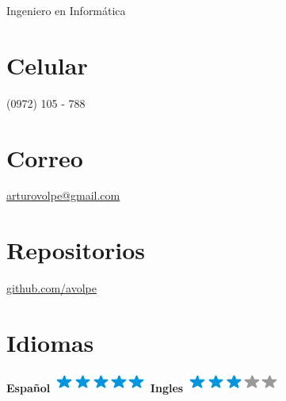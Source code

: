 \documentclass[]{friggeri-cv}
\begin{document}
{Ingeniero en Informática}


\begin{aside}
    \section{Celular}
        (0972) 105 - 788
        ~
    \section{Correo}
        \href{mailto:arturovolpe@gmail.com}{arturovolpe@gmail.com}
        ~
    \section{Repositorios}
        \href{https://github.com/avolpe}{github.com/avolpe}
        ~
\section{Idiomas}
\textbf{Español}\includegraphics[scale=0.40]{img/5stars.png}
\textbf{Ingles}\includegraphics[scale=0.40]{img/3stars.png}
\end{aside}
\end{document}
